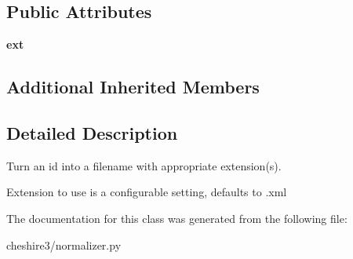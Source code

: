\subsection*{Public Attributes}
\begin{DoxyCompactItemize}
\item 
\hypertarget{classcheshire3_1_1normalizer_1_1_id_to_filename_normalizer_a78562c48ca8533af674d4f364f441ab9}{{\bfseries ext}}\label{classcheshire3_1_1normalizer_1_1_id_to_filename_normalizer_a78562c48ca8533af674d4f364f441ab9}

\end{DoxyCompactItemize}
\subsection*{Additional Inherited Members}


\subsection{Detailed Description}
\begin{DoxyVerb}Turn an id into a filename with appropriate extension(s).

Extension to use is a configurable setting, defaults to .xml
\end{DoxyVerb}
 

The documentation for this class was generated from the following file\-:\begin{DoxyCompactItemize}
\item 
cheshire3/normalizer.\-py\end{DoxyCompactItemize}
